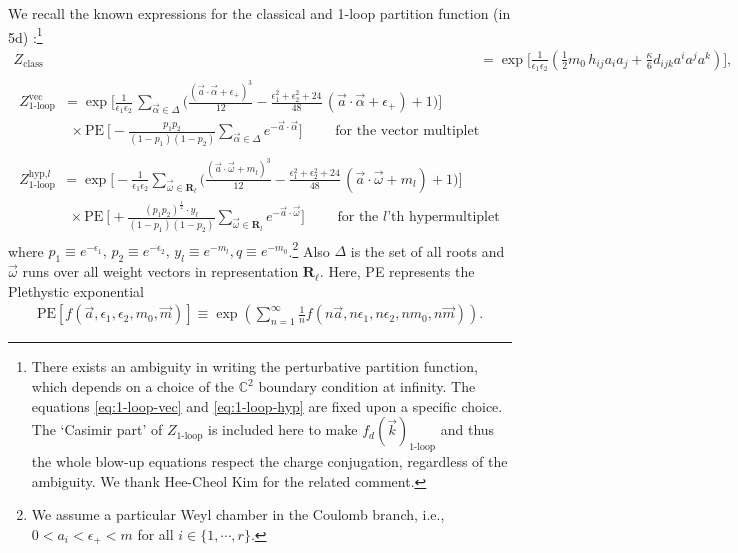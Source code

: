 \documentclass[letterpaper, 11pt]{article}
\def\IC{\mathbb{C}}
\def\a{\alpha}
\def\e{\epsilon}
\def\w{\omega}
\def\D{\Delta}
\begin{document}
We recall the known expressions for the classical and 1-loop partition function (in 5d) \cite{Intriligator:1997pq,Nekrasov:2002qd,Shadchin:2005mx}:\footnote{There exists an ambiguity in writing the perturbative partition function, which depends on a choice of the $\IC^2$ boundary condition at infinity. The equations \eqref{eq:1-loop-vec} and \eqref{eq:1-loop-hyp} are fixed upon a specific choice. 
The `Casimir part' of $Z_{\text{1-loop}}$ is included here to make $f_d(\vec{k})_\text{1-loop}$ and thus the whole blow-up equations respect the charge conjugation, regardless of the ambiguity. We thank Hee-Cheol Kim for the related comment.}
\begin{align}
   { Z_{\textrm{class}}} &= \exp \Bigg[\frac{1}{\epsilon_1\epsilon_2}\left(\frac{1}{2}m_0 \, h_{ij}a_i a_j +\frac{\kappa}{6}d_{ijk} a^{i}a^j a^k\right) \Bigg],\\
   \begin{split}  \label{eq:1-loop-vec}
   { Z_{\textrm{1-loop}}^\text{vec}} &= \exp \Bigg[\frac{1}{\epsilon_1\epsilon_2} \,  \sum_{\vec{\alpha}\in\Delta}\Big(\frac{(\vec{a}\cdot\vec{\alpha}+\e_+)^3}{12}-\frac{\e_1^2+\e_2^2+24}{48}\,(\vec{a}\cdot\vec{\alpha}+\e_+)+1\Big)\Bigg]\\ & ~~\times \text{PE}\ \Bigg[- \frac{p_1 p_2}{(1-p_1)(1-p_2) }\sum_{\vec{\a} \in \D} e^{- \vec{a} \cdot \vec{\a}}  \Bigg]  \qquad \text{ for the vector multiplet}
   \end{split} \\
   \begin{split}  \label{eq:1-loop-hyp}
   { Z_{\textrm{1-loop}}^\text{hyp,$l$}} &= \exp \Bigg[-\frac{1}{\epsilon_1\epsilon_2} \sum_{\vec{\omega}\in\mathbf{R}_l}\Big(\frac{(\vec{a}\cdot\vec{\omega}+m_l)^3}{12}-\frac{\e_1^2+\e_2^2+24}{48}\,(\vec{a}\cdot\vec{\omega}+m_l)+1\Big)\Bigg]\\ &
   ~~\times \text{PE}\ \Bigg[+ \frac{(p_1 p_2)^{\frac{1}{2}} \cdot  y_\ell } {(1-p_1)(1-p_2) }\sum_{\vec{\omega}\in\mathbf{R}_l}e^{-\vec{a} \cdot \vec{\w}}\Bigg] \qquad \text{ for the $l$'th hypermultiplet}
   \end{split}
\end{align}
where $p_1 \equiv e^{-\e_1},\, p_2 \equiv e^{-\e_2},\, y_l \equiv e^{-m_{l}}, q \equiv e^{-m_0}$.\footnote{We assume a particular Weyl chamber in the Coulomb branch, i.e., $ 0< a_i < \e_+ < m$ for all $i\in \{1,\cdots, r\}$.} Also $\Delta$ is the set of all roots and $\vec{\omega}	$ runs over all weight vectors in representation $\mathbf{R}_\ell$. 
Here, PE represents the Plethystic exponential
\begin{align}
  \label{eq:PE}
  \text{PE}\left[f(\vec{a},\e_1,\e_2, m_0 ,\vec{m})\right] \equiv \exp\left(\sum_{n=1}^\infty\frac{1}{n} f(n\vec{a},n\e_1,n\e_2,n m_0,n\vec{m})\right).
\end{align}
\end{document}
